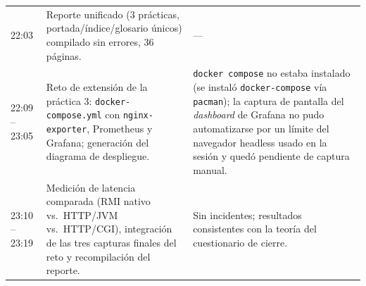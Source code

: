 \begin{center}
\begin{xltabular}{\linewidth}{lXX}
22:03 & Reporte unificado (3 prácticas, portada/índice/glosario únicos) compilado sin errores, 36 páginas. & --- \\
22:09 -- 23:05 & Reto de extensión de la práctica 3: \texttt{docker-compose.yml} con \texttt{nginx-exporter}, Prometheus y Grafana; generación del diagrama de despliegue. & \texttt{docker compose} no estaba instalado (se instaló \texttt{docker-compose} vía \texttt{pacman}); la captura de pantalla del \emph{dashboard} de Grafana no pudo automatizarse por un límite del navegador headless usado en la sesión y quedó pendiente de captura manual. \\
23:10 -- 23:19 & Medición de latencia comparada (RMI nativo vs.\ HTTP/JVM vs.\ HTTP/CGI), integración de las tres capturas finales del reto y recompilación del reporte. & Sin incidentes; resultados consistentes con la teoría del cuestionario de cierre. \\
\end{xltabular}
\end{center}
